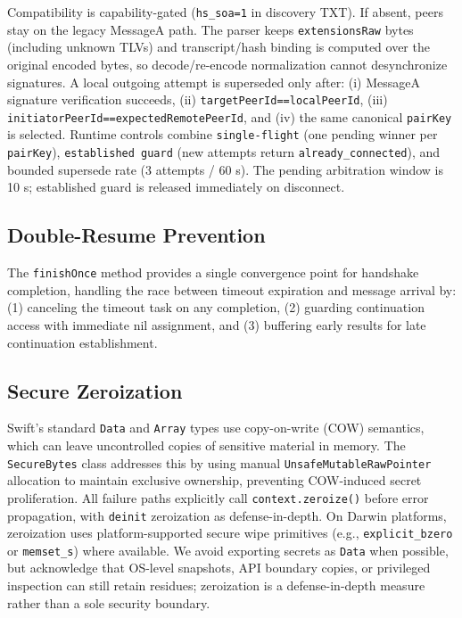 \documentclass[10pt,journal,compsoc]{IEEEtran}
\begin{document}
Compatibility is capability-gated (\texttt{hs\_soa=1} in discovery TXT).
If absent, peers stay on the legacy MessageA path. The parser keeps
\texttt{extensionsRaw} bytes (including unknown TLVs) and transcript/hash
binding is computed over the original encoded bytes, so decode/re-encode
normalization cannot desynchronize signatures. A local outgoing attempt
is superseded only after: (i) MessageA signature verification succeeds,
(ii) \texttt{targetPeerId==localPeerId}, (iii)
\texttt{initiatorPeerId==expectedRemotePeerId}, and (iv) the same
canonical \texttt{pairKey} is selected. Runtime controls combine
\texttt{single-flight} (one pending winner per \texttt{pairKey}),
\texttt{established guard} (new attempts return
\texttt{already\_connected}), and bounded supersede rate
(3 attempts / 60 s). The pending arbitration window is 10 s; established
guard is released immediately on disconnect.

\subsection{Double-Resume
Prevention}\label{d.-double-resume-prevention}

The \texttt{finishOnce} method provides a single convergence point for handshake completion, handling the race between timeout expiration and message arrival by: (1) canceling the timeout task on any completion, (2) guarding continuation access with immediate nil assignment, and (3) buffering early results for late continuation establishment.

\subsection{Secure Zeroization}\label{e.-secure-zeroization}

Swift's standard \texttt{Data} and \texttt{Array} types use copy-on-write (COW) semantics, which can leave uncontrolled copies of sensitive material in memory. The \texttt{SecureBytes} class addresses this by using manual \texttt{UnsafeMutableRawPointer} allocation to maintain exclusive ownership, preventing COW-induced secret proliferation. All failure paths explicitly call \texttt{context.zeroize()} before error propagation, with \texttt{deinit} zeroization as defense-in-depth. On Darwin platforms, zeroization uses platform-supported secure wipe primitives (e.g., \texttt{explicit\_bzero} or \texttt{memset\_s}) where available. We avoid exporting secrets as \texttt{Data} when possible, but acknowledge that OS-level snapshots, API boundary copies, or privileged inspection can still retain residues; zeroization is a defense-in-depth measure rather than a sole security boundary.
\end{document}
